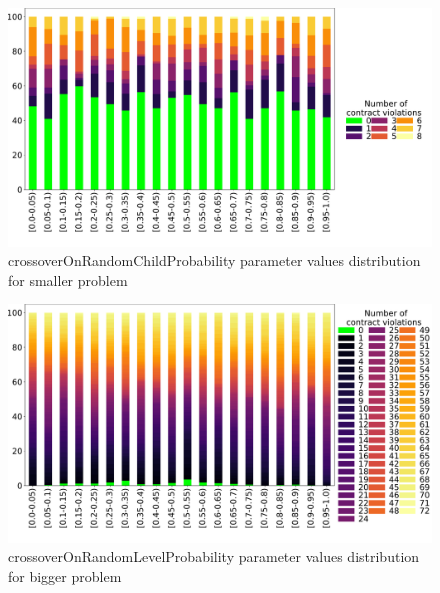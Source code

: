 \begin{figure}
	\centering
	\includegraphics[width=\textwidth]{images/DistrValiditySmall/crossoverOnRandomChildProbability.pdf}
	\caption[crossoverOnRandomChildProbability parameter values distribution for smaller problem]{crossoverOnRandomChildProbability parameter values distribution for smaller problem}
	\label{fig:crossoverOnRandomChildProbability_DistSmall}
\end{figure}
\begin{figure}
	\centering
	\includegraphics[width=\textwidth]{images/DistrValidityBig/crossoverOnRandomLevelProbability.pdf}
	\caption[crossoverOnRandomLevelProbability parameter values distribution for bigger problem]{crossoverOnRandomLevelProbability parameter values distribution for bigger problem}
	\label{fig:crossoverOnRandomLevelProbability_DistBig}
\end{figure}
